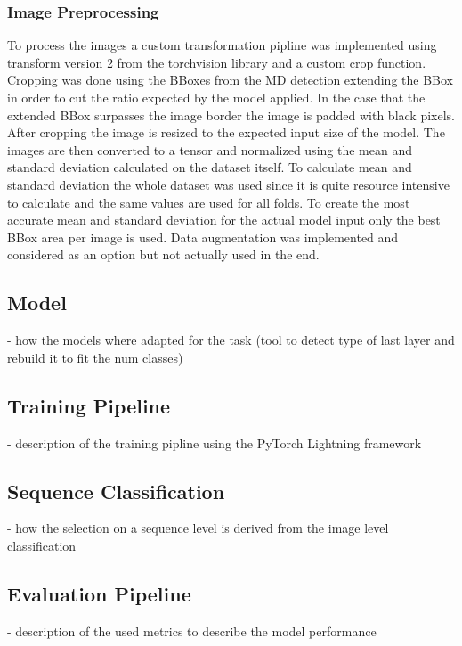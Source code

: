         \subsubsection{Image Preprocessing}
        To process the images a custom transformation pipline was implemented using transform version 2 from the torchvision library and a custom crop function.
        Cropping was done using the BBoxes from the MD detection extending the BBox in order to cut the ratio expected by the model applied.
        In the case that the extended BBox surpasses the image border the image is padded with black pixels.
        After cropping the image is resized to the expected input size of the model.
        The images are then converted to a tensor and normalized using the mean and standard deviation calculated on the dataset itself.
        To calculate mean and standard deviation the whole dataset was used since it is quite resource intensive to calculate and the same values are used for all folds.
        To create the most accurate mean and standard deviation for the actual model input only the best BBox area per image is used.
        Data augmentation was implemented and considered as an option but not actually used in the end.

    \subsection{Model}
    - how the models where adapted for the task (tool to detect type of last layer and rebuild it to fit the num classes)

    \subsection{Training Pipeline}
    - description of the training pipline using the PyTorch Lightning framework

    \subsection{Sequence Classification}
    - how the selection on a sequence level is derived from the image level classification

    \subsection{Evaluation Pipeline}
    - description of the used metrics to describe the model performance
